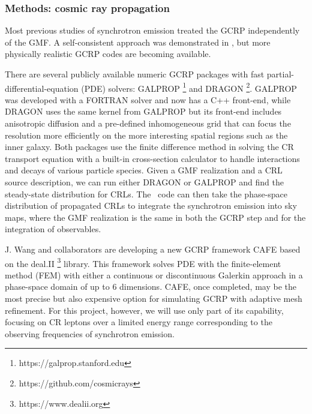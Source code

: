 

\subsubsection*{Methods: cosmic ray propagation}

Most previous studies of synchrotron emission treated the GCRP independently of the GMF.  A self-consistent approach was demonstrated in \cite{jaffe:2011}, but more physically realistic GCRP codes are becoming available.  

There are several publicly available numeric GCRP packages with fast partial-differential-equation (PDE) solvers:  GALPROP \footnote{https://galprop.stanford.edu} and DRAGON \footnote{https://github.com/cosmicrays}.
GALPROP was developed with a FORTRAN solver and now has a C++ front-end, while DRAGON uses the same kernel from GALPROP but its front-end includes anisotropic diffusion and a pre-defined inhomogeneous grid that can focus the resolution more efficiently on the more interesting spatial regions such as the inner galaxy.
Both packages use the finite difference method in solving the CR transport equation with a built-in cross-section calculator to handle interactions and decays of various particle species.
Given a GMF realization and a CRL source description, we can run either DRAGON or GALPROP and find the steady-state distribution for CRLs.
The \hammurabi\ code can then take the phase-space distribution of propagated CRLs to integrate the synchrotron emission into sky maps, where the GMF realization is the same in both the GCRP step and for the integration of observables.  

J. Wang and collaborators are developing a new GCRP framework CAFE based on the deal.II \footnote{https://www.dealii.org} library. 
This framework solves PDE with the finite-element method (FEM) with either a  continuous or discontinuous Galerkin approach in a phase-space domain of up to 6 dimensions.
CAFE, once completed, may be the most precise but also expensive option for simulating GCRP with adaptive mesh refinement.  For this project, however, we will use only part of its capability, focusing on CR leptons over a limited energy range corresponding to the observing frequencies of synchrotron emission.  

